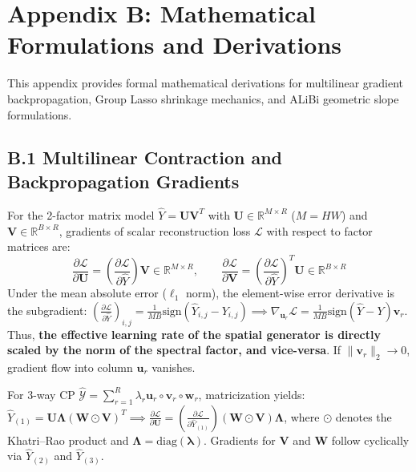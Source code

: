 \section*{Appendix B: Mathematical Formulations and Derivations}
\label{app:derivations}

This appendix provides formal mathematical derivations for multilinear gradient backpropagation, Group Lasso shrinkage mechanics, and ALiBi geometric slope formulations.

\subsection*{B.1 Multilinear Contraction and Backpropagation Gradients}
For the 2-factor matrix model $\hat{Y} = \mathbf{U} \mathbf{V}^T$ with $\mathbf{U} \in \mathbb{R}^{M \times R}$ ($M=HW$) and $\mathbf{V} \in \mathbb{R}^{B \times R}$, gradients of scalar reconstruction loss $\mathcal{L}$ with respect to factor matrices are:
\begin{equation}
\frac{\partial \mathcal{L}}{\partial \mathbf{U}} = \left( \frac{\partial \mathcal{L}}{\partial \hat{Y}} \right) \mathbf{V} \in \mathbb{R}^{M \times R}, \qquad \frac{\partial \mathcal{L}}{\partial \mathbf{V}} = \left( \frac{\partial \mathcal{L}}{\partial \hat{Y}} \right)^T \mathbf{U} \in \mathbb{R}^{B \times R}
\end{equation}
Under the mean absolute error ($\ell_1$ norm), the element-wise error derivative is the subgradient: $(\frac{\partial \mathcal{L}}{\partial \hat{Y}})_{i, j} = \frac{1}{MB} \text{sign}(\hat{Y}_{i, j} - Y_{i, j}) \implies \nabla_{\mathbf{u}_r} \mathcal{L} = \frac{1}{MB} \text{sign}(\hat{Y} - Y) \mathbf{v}_r$.
Thus, \textbf{the effective learning rate of the spatial generator is directly scaled by the norm of the spectral factor, and vice-versa}. If $\|\mathbf{v}_r\|_2 \to 0$, gradient flow into column $\mathbf{u}_r$ vanishes.

For 3-way CP $\hat{\mathcal{Y}} = \sum_{r=1}^R \lambda_r \mathbf{u}_r \circ \mathbf{v}_r \circ \mathbf{w}_r$, matricization yields: $\hat{Y}_{(1)} = \mathbf{U} \boldsymbol{\Lambda} (\mathbf{W} \odot \mathbf{V})^T \implies \frac{\partial \mathcal{L}}{\partial \mathbf{U}} = (\frac{\partial \mathcal{L}}{\partial \hat{Y}_{(1)}}) (\mathbf{W} \odot \mathbf{V}) \boldsymbol{\Lambda}$, where $\odot$ denotes the Khatri--Rao product and $\boldsymbol{\Lambda} = \text{diag}(\boldsymbol{\lambda})$. Gradients for $\mathbf{V}$ and $\mathbf{W}$ follow cyclically via $\hat{Y}_{(2)}$ and $\hat{Y}_{(3)}$.

